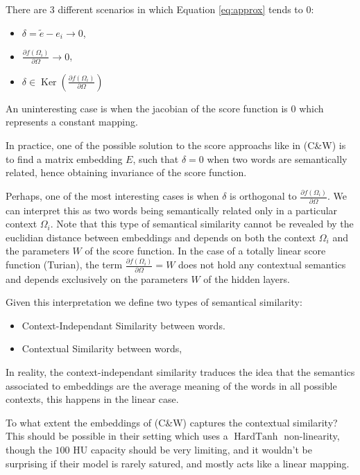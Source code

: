 \documentclass[11pt]{article} %
\begin{document}
There are 3 different scenarios in which Equation \ref{eq:approx} tends to $0$:
\begin{itemize}
\item $\delta = \tilde{e} - e_{i} \longrightarrow 0$,
\item  $\frac{\partial f(\Omega_i) }{\partial  \Omega}\longrightarrow  0$,
\item $\delta \in \operatorname{Ker} \left( \frac{\partial f(\Omega_i) }{\partial  \Omega} \right)$

\end{itemize}
An uninteresting case is when the jacobian of the score function is $0$ which represents a constant mapping.

In practice, one of the possible solution to the score approachs like in (C\&W) is to find a matrix embedding $E$,
such that $\delta = 0$ when two words are semantically related, hence obtaining invariance of the score function.

Perhaps, one of the most interesting cases is when $\delta$ is orthogonal to $\frac{\partial f(\Omega_i) }{\partial  \Omega}$. We can interpret this as two words being semantically related only in a particular context $\Omega_i$. Note that this type of semantical similarity cannot be revealed by the euclidian distance between embeddings and depends on both the context $\Omega_i$ and the parameters $W$ of the score function. In the case of a totally linear score function (Turian), the term $\frac{\partial f(\Omega_i) }{\partial  \Omega} = W$ does not hold any contextual semantics and depends exclusively on the parameters $W$ of the hidden layers.

Given this interpretation we define two types of semantical similarity:
\begin{itemize}
\item Context-Independant Similarity between words.
\item Contextual  Similarity between words,
\end{itemize}


In reality, the context-independant similarity traduces the idea that the semantics associated to embeddings are the average meaning of the words in all possible contexts, this happens in the linear case.

To what extent the embeddings of (C\&W) captures the contextual similarity? This should be possible in their setting which uses a $\operatorname{HardTanh}$ non-linearity, though the $100$ HU capacity should be very limiting, and it wouldn't be surprising if their model is rarely satured, and mostly acts like a linear mapping.
\end{document}
